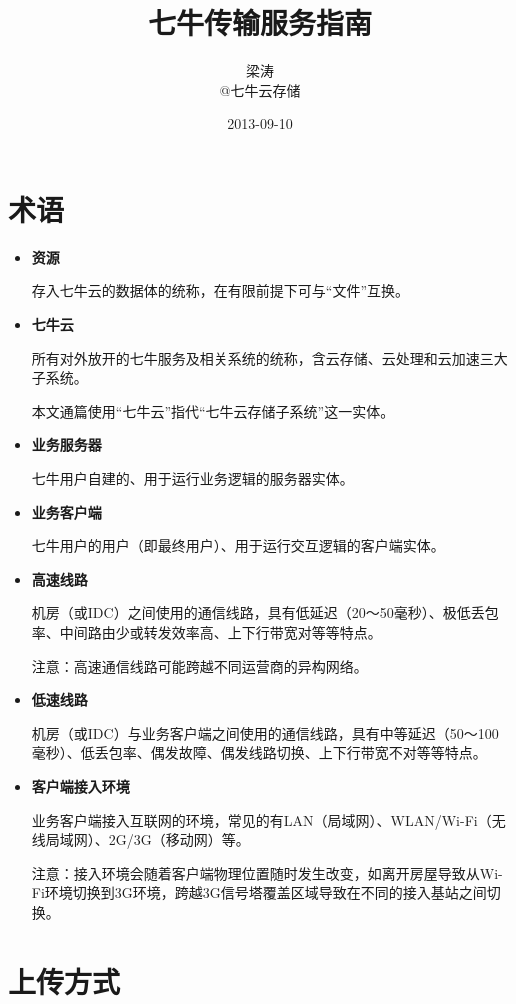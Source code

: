 \documentclass[11pt, oneside]{book}
\title{七牛传输服务指南}
\author{梁涛 \\ @七牛云存储}
\date{2013-09-10}
\newcommand{\qhint}[1]{
\footnotesize
\vspace{0.2em}
\noindent
#1\par
\vspace{-0.5em}
\normalsize
}
\begin{document}
\maketitle
\tableofcontents

\chapter{术语}


\begin{itemize}
\item {\bf 资源}\par
\qhint{存入七牛云的数据体的统称，在有限前提下可与“文件”互换。}

\item {\bf 七牛云}\par
\qhint{所有对外放开的七牛服务及相关系统的统称，含云存储、云处理和云加速三大子系统。}
\qhint{本文通篇使用“七牛云”指代“七牛云存储子系统”这一实体。}

\item {\bf 业务服务器}\par
\qhint{七牛用户自建的、用于运行业务逻辑的服务器实体。}

\item {\bf 业务客户端}\par
\qhint{七牛用户的用户（即最终用户）、用于运行交互逻辑的客户端实体。}

\item {\bf 高速线路}\par
\qhint{机房（或IDC）之间使用的通信线路，具有低延迟（20～50毫秒）、极低丢包率、中间路由少或转发效率高、上下行带宽对等等特点。}
\qhint{注意：高速通信线路可能跨越不同运营商的异构网络。}

\item {\bf 低速线路}\par
\qhint{机房（或IDC）与业务客户端之间使用的通信线路，具有中等延迟（50～100毫秒）、低丢包率、偶发故障、偶发线路切换、上下行带宽不对等等特点。}

\item {\bf 客户端接入环境}\par
\qhint{业务客户端接入互联网的环境，常见的有LAN（局域网）、WLAN/Wi-Fi（无线局域网）、2G/3G（移动网）等。}
\qhint{注意：接入环境会随着客户端物理位置随时发生改变，如离开房屋导致从Wi-Fi环境切换到3G环境，跨越3G信号塔覆盖区域导致在不同的接入基站之间切换。}
\end{itemize}

\chapter{上传方式}
\end{document}
